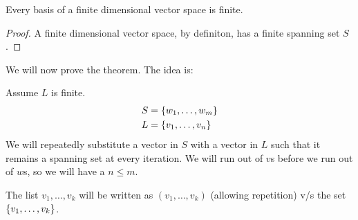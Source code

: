 
\begin{cor} \label{cor:finite_basis}
    Every basis of a finite dimensional vector space is finite.
\end{cor}
\begin{proof}
    A finite dimensional vector space, by definiton, has a finite spanning set $S$. 
\end{proof}

We will now prove the theorem. The idea is:

Assume $L$ is finite.
\begin{align*}
    S &= \set{w_{1}, \dots, w_{m}} \\
    L &= \set{v_{1}, \dots, v_{n}}
\end{align*}
We will repeatedly substitute a vector in $S$ with a vector in $L$ such that it remains a spanning set at every iteration.
We will run out of $v$s before we run out of $w$s, so we will have a $n \leq m$.

\begin{rem}
    The list $v_{1}, \dots, v_{k}$ will be written as $(v_{1}, \dots, v_{k})$ (allowing repetition) v/s the set $\set{v_{1}, \dots, v_{k}}$.
\end{rem}

